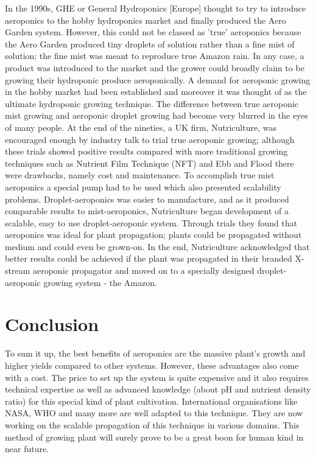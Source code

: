 \documentclass{article}
\begin{document}
In the 1990s, GHE or General Hydroponics [Europe] thought to try to introduce aeroponics to the hobby hydroponics market and finally produced the Aero Garden system. However, this could not be classed as 'true' aeroponics because the Aero Garden produced tiny droplets of solution rather than a fine mist of solution; the fine mist was meant to reproduce true Amazon rain. In any case, a product was introduced to the market and the grower could broadly claim to be growing their hydroponic produce aeroponically. A demand for aeroponic growing in the hobby market had been established and moreover it was thought of as the ultimate hydroponic growing technique. The difference between true aeroponic mist growing and aeroponic droplet growing had become very blurred in the eyes of many people. At the end of the nineties, a UK firm, Nutriculture, was encouraged enough by industry talk to trial true aeroponic growing; although these trials showed positive results compared with more traditional growing techniques such as Nutrient Film Technique (NFT) and Ebb and Flood there were drawbacks, namely cost and maintenance. To accomplish true mist aeroponics a special pump had to be used which also presented scalability problems. Droplet-aeroponics was easier to manufacture, and as it produced comparable results to mist-aeroponics, Nutriculture began development of a scalable, easy to use droplet-aeroponic system. Through trials they found that aeroponics was ideal for plant propagation; plants could be propagated without medium and could even be grown-on. In the end, Nutriculture acknowledged that better results could be achieved if the plant was propagated in their branded X-stream aeroponic propagator and moved on to a specially designed droplet-aeroponic growing system - the Amazon.
\section{Conclusion}
To sum it up, the best benefits of aeroponics are the massive plant’s growth and higher yields compared to other systems. However, these advantages also come with a cost. The price to set up the system is quite expensive and it also requires technical expertise as well as advanced knowledge (about pH and nutrient density ratio) for this special kind of plant cultivation. International organisations like NASA, WHO and many more are well adapted to this technique. They are now working on the scalable propagation of this technique in various domains. This method of growing plant will surely prove to be a great boon for human kind in near future.
\end{document}
